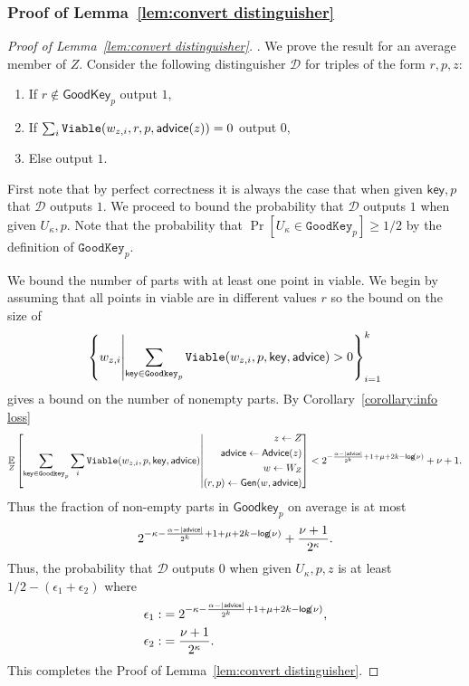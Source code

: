 \subsubsection{Proof of Lemma~\ref{lem:convert distinguisher}}

\begin{proof}[Proof of Lemma~\ref{lem:convert distinguisher}].
We prove the result for an average member of $Z$.
Consider the following distinguisher $\mathcal{D}$ for triples of the form $r, p, z$:
\begin{enumerate}
\item If $r \not\in \mathsf{GoodKey}_p$ output $1$,
\item If $\sum_{i} \mathtt{Viable}(w_{z, i}, r, p, {\mathsf{advice}}(z)) =0 $ output $0$,
\item Else output $1$.
\end{enumerate}
First note that by perfect correctness it is always the case that when given $\mathsf{key}, p$ that $\mathcal{D}$ outputs $1$.  We proceed to bound the probability that $\mathcal{D}$ outputs $1$ when given $U_\kappa, p$.  Note that the probability that $\Pr[U_\kappa \in \mathtt{GoodKey}_p] \ge 1/2$ by the definition of $\mathtt{GoodKey}_p$. 

We bound the number of parts with at least one point in viable.  We begin by assuming that all points in viable are in different  values $r$ so the bound on the size of 
\[
\left\{w_{z, i} \middle|\sum_{\mathsf{key}\in\mathtt{Goodkey}_p} \mathtt{Viable}(w_{z,i}, p, \mathsf{key}, {\mathsf{advice}})>0\right\}_{i=1}^k 
\] 
gives a bound on the number of nonempty parts. By Corollary~\ref{corollary:info loss} 
\[
\operatorname*{\mathbb{E}}_{Z} \left[\sum_{\mathsf{key} \in \mathtt{Goodkey}_p}\sum_{i }  \mathtt{Viable}(w_{z,i}, p, \mathsf{key}, {\mathsf{advice}}) \middle| \begin{aligned} z\leftarrow Z\\ {\mathsf{advice}}\leftarrow {\ensuremath{\mathsf{Advice}}}(z)\\w\leftarrow W_Z\\(r, p)\leftarrow {\ensuremath{\mathsf{Gen}}}(w, {\mathsf{advice}})\end{aligned} \right]< 2^{-\frac{\alpha-|{\mathsf{advice}}|}{2^k}+1+\mu+2k-\mathsf{log}\!\left(\nu\right)}+\nu+1.
\]
Thus the fraction of non-empty parts in $\mathsf{Goodkey}_p$ on average is at most 
\[
2^{-\kappa-\frac{\alpha-|{\mathsf{advice}}|}{2^k}+1+\mu+2k-\mathsf{log}\!\left(\nu\right)}+\frac{\nu+1}{2^\kappa}.
\]
Thus, the probability that $\mathcal{D}$ outputs $0$ when given $U_\kappa, p, z$ is at least 
$1/2-(\epsilon_1+\epsilon_2)$
where 
\begin{align*}
\epsilon_1:&=2^{-\kappa-\frac{\alpha-|{\mathsf{advice}}|}{2^k}+1+\mu+2k-\mathsf{log}\!\left(\nu\right)},\\
\epsilon_2:&=\frac{\nu+1}{2^{\kappa}}.
\end{align*}
\noindent
This completes the Proof of Lemma~\ref{lem:convert distinguisher}.
\end{proof}

